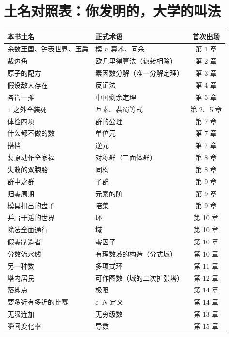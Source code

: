 \appendix

\chapter{土名对照表：你发明的，大学的叫法}
\label{app:tuming}

\begin{center}
\begin{longtable}{p{} p{} c}
\toprule
本书土名 & 正式术语 & 首次出场 \\
\midrule
\endhead
余数王国、钟表世界、压扁 & 模 $n$ 算术、同余 & 第 1 章 \\
裁边角 & 欧几里得算法（辗转相除） & 第 2 章 \\
原子的配方 & 素因数分解（唯一分解定理） & 第 3 章 \\
假设敌人存在 & 反证法 & 第 4 章 \\
各管一摊 & 中国剩余定理 & 第 5 章 \\
$1$ 之外全装死 & 互素、裴蜀等式 & 第 2、5 章 \\
体检四项 & 群的公理 & 第 7 章 \\
什么都不做的数 & 单位元 & 第 7 章 \\
搭档 & 逆元 & 第 7 章 \\
复原动作全家福 & 对称群（二面体群） & 第 8 章 \\
失散的双胞胎 & 同构 & 第 8 章 \\
群中之群 & 子群 & 第 9 章 \\
归零周期 & 元素的阶 & 第 9 章 \\
模具扣出的盘子 & 陪集 & 第 9 章 \\
并肩干活的世界 & 环 & 第 10 章 \\
除法全面通行 & 域 & 第 10 章 \\
假零制造者 & 零因子 & 第 10 章 \\
分数流水线 & 有理数域的构造（分式域） & 第 10 章 \\
另一种数 & 多项式环 & 第 11 章 \\
塔内居民 & 可作图数（域的二次扩张塔） & 第 12 章 \\
落脚点 & 极限 & 第 14 章 \\
要多近有多近的比赛 & $\varepsilon$--$N$ 定义 & 第 14 章 \\
无限连加 & 无穷级数 & 第 13 章 \\
瞬间变化率 & 导数 & 第 15 章 \\

\end{longtable}
\end{center}
